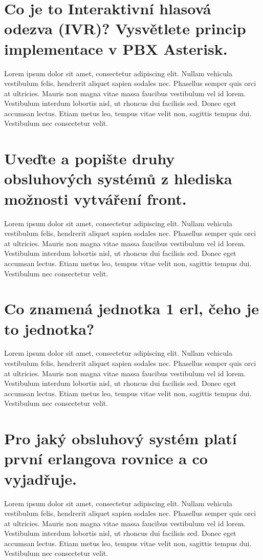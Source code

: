 \section{Co je to Interaktivní hlasová odezva (IVR)? Vysvětlete princip implementace v PBX Asterisk.}
Lorem ipsum dolor sit amet, consectetur adipiscing elit. Nullam vehicula vestibulum felis, hendrerit aliquet sapien sodales nec. Phasellus semper quis orci at ultricies. Mauris non magna vitae massa faucibus vestibulum vel id lorem. Vestibulum interdum lobortis nisl, ut rhoncus dui facilisis sed. Donec eget accumsan lectus. Etiam metus leo, tempus vitae velit non, sagittis tempus dui. Vestibulum nec consectetur velit.

\section{Uveďte a popište druhy obsluhových systémů z hlediska možnosti vytváření front.}
Lorem ipsum dolor sit amet, consectetur adipiscing elit. Nullam vehicula vestibulum felis, hendrerit aliquet sapien sodales nec. Phasellus semper quis orci at ultricies. Mauris non magna vitae massa faucibus vestibulum vel id lorem. Vestibulum interdum lobortis nisl, ut rhoncus dui facilisis sed. Donec eget accumsan lectus. Etiam metus leo, tempus vitae velit non, sagittis tempus dui. Vestibulum nec consectetur velit.

\section{Co znamená jednotka 1 erl, čeho je to jednotka?}
Lorem ipsum dolor sit amet, consectetur adipiscing elit. Nullam vehicula vestibulum felis, hendrerit aliquet sapien sodales nec. Phasellus semper quis orci at ultricies. Mauris non magna vitae massa faucibus vestibulum vel id lorem. Vestibulum interdum lobortis nisl, ut rhoncus dui facilisis sed. Donec eget accumsan lectus. Etiam metus leo, tempus vitae velit non, sagittis tempus dui. Vestibulum nec consectetur velit.

\section{Pro jaký obsluhový systém platí první erlangova rovnice a co vyjadřuje.}
Lorem ipsum dolor sit amet, consectetur adipiscing elit. Nullam vehicula vestibulum felis, hendrerit aliquet sapien sodales nec. Phasellus semper quis orci at ultricies. Mauris non magna vitae massa faucibus vestibulum vel id lorem. Vestibulum interdum lobortis nisl, ut rhoncus dui facilisis sed. Donec eget accumsan lectus. Etiam metus leo, tempus vitae velit non, sagittis tempus dui. Vestibulum nec consectetur velit.

